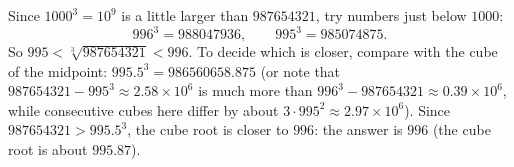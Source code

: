 Since $1000^3=10^9$ is a little larger than $987654321$, try numbers just below $1000$:
\[996^3=988047936,\qquad995^3=985074875.\]
So $995<\sqrt[3]{987654321}<996$. To decide which is closer, compare with the cube of the midpoint: $995.5^3=986560658.875$ (or note that $987654321-995^3\approx2.58\times10^6$ is much more than $996^3-987654321\approx0.39\times10^6$, while consecutive cubes here differ by about $3\cdot995^2\approx2.97\times10^6$). Since $987654321>995.5^3$, the cube root is closer to $996$: the answer is $\boxed{996}$ (the cube root is about $995.87$).
